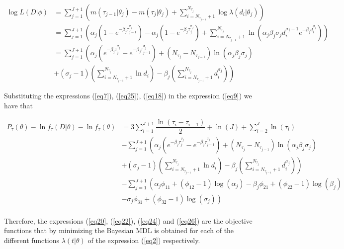\documentclass[APA,STIX1COL]{WileyNJD-v2}
\begin{document}
\begin{align}
	\label{eq25}
	\log L(D|\phi)&=\sum_{j=1}^{J+1} \left(  m(\tau_{j-1}|\theta_j)-m(\tau_j|\theta_j)+\sum_{i= N_{\tau_{j-1}}+1}^{ N_{\tau_j}} \log\lambda(d_i|\theta_j)   \right)\nonumber\\
	&=\sum_{j=1}^{J+1} \left(   \alpha_j\left(1-  e^{-\beta_j \tau_{j-1}^{\sigma_j } }\right)- \alpha_j\left(1-  e^{-\beta_j \tau_{j}^{\sigma_j } }\right) +\sum_{i= N_{\tau_{j-1}}+1}^{ N_{\tau_j}} \ln\left( \alpha_j\beta_j\sigma_j  d_i^{\sigma_j -1} e^{-\beta_j d_i^{\sigma_j}} \right)  \right)\nonumber\\
	&=\sum_{j=1}^{J+1} \left(  \alpha_j\left(e^{-\beta_j \tau_{j}^{\sigma_j } }-  e^{-\beta_j \tau_{j-1}^{\sigma_j } }\right) + (N_{\tau_j}-N_{\tau_{j-1}}) \ln( \alpha_j\beta_j\sigma_j ) \right.\nonumber\\
	&\left.+ (\sigma_j -1)\left( \sum_{i= N_{\tau_{j-1}}+1}^{ N_{\tau_j}}\ln d_i\right)-\beta_j \left( \sum_{i= N_{\tau_{j-1}}+1}^{ N_{\tau_j}}d_i^{\sigma_j}\right)  \right)
\end{align}

Substituting the expressions (\ref{eq7}), (\ref{eq25}), (\ref{eq18}) in the expression (\ref{eq9}) we have that 

\begin{align}
	\label{eq26}
	P_{\tau}(\theta) - \ln f_\tau(D|\theta) - \ln f_\tau(\theta) 
	&=3\sum_{i=1}^{J+1}\dfrac{\ln(\tau_i-\tau_{i-1})}{2}+  \ln(J) + \sum_{i=2}^J\ln(\tau_i)\nonumber\\
	&-\sum_{j=1}^{J+1} \left(  \alpha_j\left(e^{-\beta_j \tau_{j}^{\sigma_j } }-  e^{-\beta_j \tau_{j-1}^{\sigma_j } }\right) + (N_{\tau_j}-N_{\tau_{j-1}}) \ln( \alpha_j\beta_j\sigma_j ) \right.\nonumber\\
	&\left.+ (\sigma_j -1)\left( \sum_{i= N_{\tau_{j-1}}+1}^{ N_{\tau_j}}\ln d_i\right)-\beta_j \left( \sum_{i= N_{\tau_{j-1}}+1}^{ N_{\tau_j}}d_i^{\sigma_j}\right)  \right)\nonumber\\
	&-\sum_{j=1}^{J+1} \left(\alpha_j  \phi _{11}+\left(\phi _{12}-1\right) \log (\alpha_j )-\beta_j  \phi _{21}+\left(\phi _{22}-1\right) \log (\beta_j )\right.\nonumber\\
	&\left.-\sigma_j  \phi _{31}+\left(\phi _{32}-1\right) \log (\sigma_j )\right)\nonumber\\
\end{align}



Therefore, the expressions (\ref{eq20}, (\ref{eq22}), (\ref{eq24}) and (\ref{eq26}) are the objective functions that by minimizing the Bayesian MDL is obtained for each of the different functions $\lambda(t|\theta)$ of the expression (\ref{eq2}) respectively.
\end{document}

